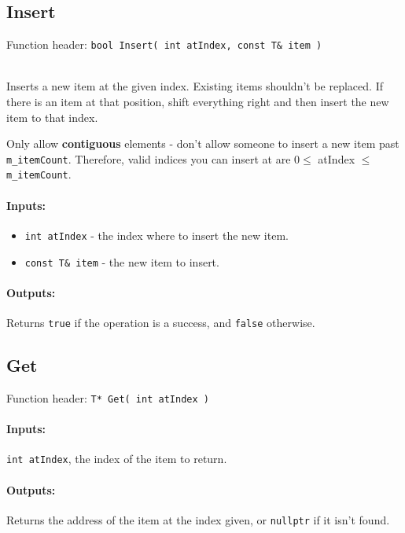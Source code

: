     \begin{framed}
    \subsection{Insert}

    Function header: \texttt{bool    Insert( int atIndex, const T\& item )}

    ~\\ Inserts a new item at the given index. Existing items shouldn't
    be replaced. If there is an item at that position, shift everything right and then
    insert the new item to that index.

    Only allow \textbf{contiguous} elements - don't allow someone to insert
    a new item past \texttt{m\_itemCount}. Therefore, valid indices you
    can insert at are $0 \leq $ atIndex $ \leq $ \texttt{m\_itemCount}.

    \paragraph{Inputs:}
        \begin{itemize}
            \item   \texttt{int atIndex} - the index where to insert the new item.
            \item   \texttt{const T\& item} - the new item to insert.
        \end{itemize}

    \paragraph{Outputs:}
        Returns \texttt{true} if the operation is a success, and \texttt{false} otherwise.

    \end{framed}

    \newpage
    
    \begin{framed}
    \subsection{Get}

    Function header: \texttt{T*      Get( int atIndex )}

    \paragraph{Inputs:}
        \texttt{int atIndex}, the index of the item to return.

    \paragraph{Outputs:}
        Returns the address of the item at the index given, or \texttt{nullptr} if it isn't found.

    \end{framed}
    
